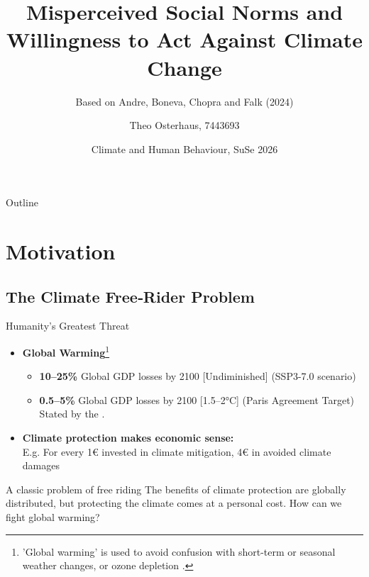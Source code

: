 \documentclass{beamer}
\title[Misperceived Social Norms and ...]{Misperceived Social Norms and Willingness to Act Against Climate Change}
\subtitle{Based on Andre, Boneva, Chopra and Falk (2024)}
\author[Theo Osterhaus]{Theo Osterhaus, 7443693}
\date[June 2026]{Climate and Human Behaviour, SuSe 2026}
\institute[WiSo Faculty]{Faculty of Management, Economics and Social Sciences \\ Universität zu Köln}
\begin{document}
\frame{\titlepage}

\begin{frame}{Outline}
    \tableofcontents
\end{frame}


\section{Motivation}
\subsection{The Climate Free‑Rider Problem}

\begin{frame}{Humanity's Greatest Threat}

    \begin{itemize}
    \setlength{\itemsep}{8pt}
        \item \textbf{Global Warming}\footnote{'Global warming' is used to avoid confusion with short-term or seasonal weather changes, or ozone depletion \cite{Lorenzoni2006}.}
        
        \begin{itemize}
            \item \textbf{10–25\%} Global GDP losses by 2100 [Undiminished] (SSP3-7.0 scenario)
            \item \textbf{0.5–5\%} Global GDP losses by 2100 [1.5–2°C] (Paris Agreement Target)
            \\ Stated by the \cite{ipcc2023}.
        \end{itemize}

        \item \textbf{Climate protection makes economic sense:} \\ 
        E.g. For every 1€ invested in climate mitigation, 4€ in avoided climate damages
    \end{itemize}

    \medskip
    
    \begin{alertblock}{A classic problem of free riding}
    The benefits of climate protection are globally distributed, but protecting the climate comes at a personal cost. How can we fight global warming?
    \end{alertblock}
    
\end{frame}
\end{document}
